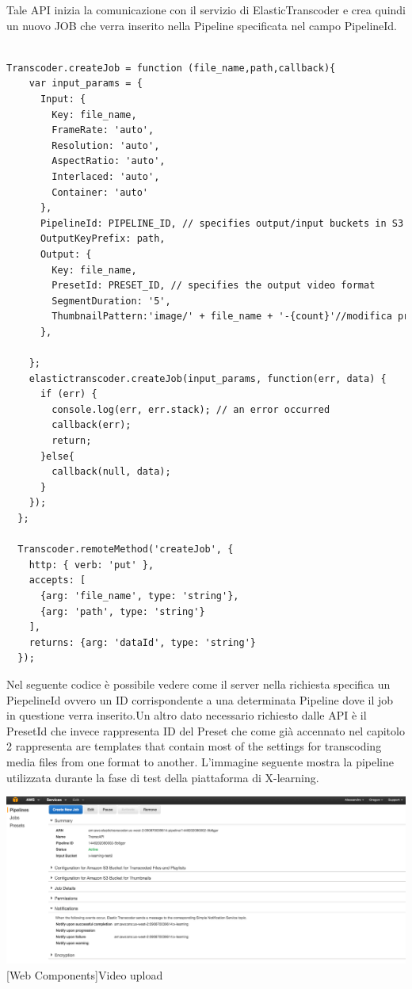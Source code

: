 Tale API inizia la comunicazione con il servizio di ElasticTranscoder e crea quindi un nuovo JOB che verra inserito nella Pipeline specificata nel campo PipelineId.
\begin{lstlisting}[language=html]
  
Transcoder.createJob = function (file_name,path,callback){
    var input_params = {
      Input: { 
        Key: file_name, 
        FrameRate: 'auto', 
        Resolution: 'auto', 
        AspectRatio: 'auto', 
        Interlaced: 'auto', 
        Container: 'auto' 
      }, 
      PipelineId: PIPELINE_ID, // specifies output/input buckets in S3 
      OutputKeyPrefix: path,
      Output: { 
        Key: file_name, 
        PresetId: PRESET_ID, // specifies the output video format
        SegmentDuration: '5',
        ThumbnailPattern:'image/' + file_name + '-{count}'//modifica preset per determinare il numero di immagini
      },

    };    
    elastictranscoder.createJob(input_params, function(err, data) {
      if (err) {
        console.log(err, err.stack); // an error occurred
        callback(err);
        return;
      }else{
        callback(null, data);
      }
    });
  };
  
  Transcoder.remoteMethod('createJob', {
    http: { verb: 'put' },
    accepts: [
      {arg: 'file_name', type: 'string'},
      {arg: 'path', type: 'string'}
    ],
    returns: {arg: 'dataId', type: 'string'}
  });
\end{lstlisting}

Nel seguente codice è possibile vedere come il server nella richiesta specifica un PiepelineId ovvero un ID corrispondente a una determinata Pipeline dove il job in questione verra inserito.Un altro dato necessario richiesto dalle API è il PresetId che invece rappresenta ID del Preset che come già accennato nel capitolo 2 rappresenta are templates that contain most of the settings for transcoding media files from one format to another.
L’immagine seguente mostra la pipeline utilizzata durante la fase di test della piattaforma di X-learning.


\begin{minipage}{\linewidth}
    \centering
    \includegraphics[width=1.0\linewidth]{images/chapter6/elastic_pipeline.png}
    [Web Components]{Video upload}
\end{minipage}


